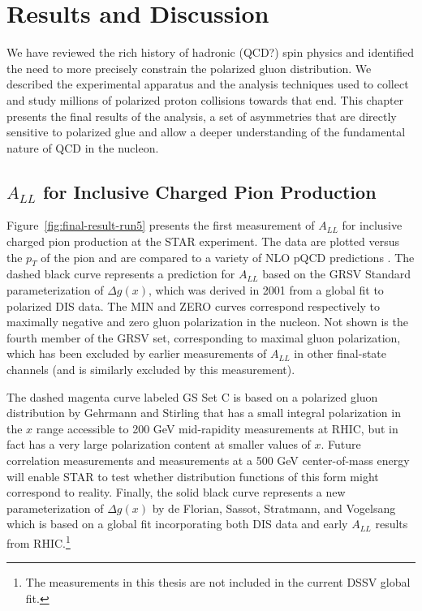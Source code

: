 \chapter{Results and Discussion}

We have reviewed the rich history of hadronic (QCD?) spin physics and identified
the need to more precisely constrain the polarized gluon distribution. We
described the experimental apparatus and the analysis techniques used to collect
and study millions of polarized proton collisions towards that end. This chapter
presents the final results of the analysis, a set of asymmetries that are
directly sensitive to polarized glue and allow a deeper understanding of the
fundamental nature of QCD in the nucleon.

\section{$A_{LL}$ for Inclusive Charged Pion Production}

Figure~\ref{fig:final-result-run5} presents the first measurement of \(A_{LL}\)
for inclusive charged pion production at the STAR experiment. The data are
plotted versus the \(p_T\) of the pion and are compared to a variety of NLO pQCD
predictions \cite{}. The dashed black curve represents a prediction for
\(A_{LL}\) based on the GRSV Standard parameterization of \(\Delta g(x)\), which
was derived in 2001 from a global fit to polarized DIS data. The MIN and ZERO
curves correspond respectively to maximally negative and zero gluon polarization
in the nucleon. Not shown is the fourth member of the GRSV set, corresponding to
maximal gluon polarization, which has been excluded by earlier measurements of
\(A_{LL}\) in other final-state channels (and is similarly excluded by this
measurement).

The dashed magenta curve labeled GS Set C is based on a polarized gluon
distribution by Gehrmann and Stirling that has a small integral polarization in
the \(x\) range accessible to 200 GeV mid-rapidity measurements at RHIC, but in
fact has a very large polarization content at smaller values of \(x\). Future
correlation measurements and measurements at a 500 GeV center-of-mass energy
will enable STAR to test whether distribution functions of this form might
correspond to reality. Finally, the solid black curve represents a new
parameterization of \(\Delta g(x)\) by de Florian, Sassot, Stratmann, and
Vogelsang which is based on a global fit incorporating both DIS data and early
\(A_{LL}\) results from RHIC.\footnote{The measurements in this thesis are not
included in the current DSSV global fit.}

